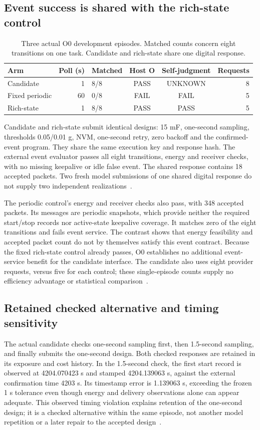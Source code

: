 \subsection{Event success is shared with the rich-state control}
\begin{table}[htbp]
\centering\small
\caption{Three actual O0 development episodes. Matched counts concern eight
transitions on one task. Candidate and rich-state share one digital response.}
\label{tab:o0}
\begin{tabular}{@{}lrlccr@{}}\toprule
Arm & Poll (s) & Matched & Host O & Self-judgment & Requests \\\midrule
Candidate & 1 & 8/8 & PASS & UNKNOWN & 8 \\
Fixed periodic & 60 & 0/8 & FAIL & FAIL & 5 \\
Rich-state & 1 & 8/8 & PASS & PASS & 5 \\
\bottomrule\end{tabular}
\end{table}

Candidate and rich-state submit identical designs: 15 mF, one-second sampling,
thresholds 0.05/0.01 g, NVM, one-second retry, zero backoff and the confirmed-event
program. They share the same execution key and response hash. The external
event evaluator passes all eight transitions, energy and receiver checks,
with no missing keepalive or idle false event. The shared response contains
18 accepted packets. Two fresh model submissions of one shared digital
response do not supply two independent realizations~\cite{episodes}.

The periodic control's energy and receiver checks also pass, with 348 accepted
packets. Its messages are periodic snapshots, which provide neither the
required start/stop records nor active-state keepalive coverage. It matches
zero of the eight transitions and fails event service. The contrast shows that
energy feasibility and accepted packet count do not by themselves satisfy this
event contract. Because the fixed rich-state control already passes, O0
establishes no additional event-service benefit for the candidate interface.
The candidate also uses eight provider requests, versus five for each control;
these single-episode counts supply no efficiency advantage or statistical
comparison~\cite{o0}.

\subsection{Retained checked alternative and timing sensitivity}
The actual candidate checks one-second sampling first, then 1.5-second
sampling, and finally submits the one-second design. Both checked responses
are retained in its exposure and cost history. In the 1.5-second check, the
first start record is observed at 4204.070423 s and stamped
4204.139063 s, against the external confirmation time 4203 s. Its timestamp
error is 1.139063 s, exceeding the frozen 1 s tolerance even though
energy and delivery observations alone can appear adequate. This observed
timing violation explains retention of the one-second design; it is a checked
alternative within the same episode, not another model repetition or a later
repair to the accepted design~\cite{episodes}.

